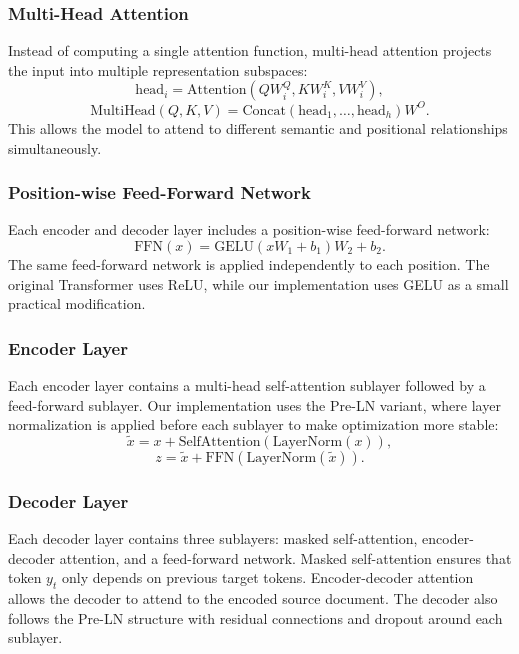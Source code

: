 \documentclass[conference]{IEEEtran}
\begin{document}
\subsubsection{Multi-Head Attention}
Instead of computing a single attention function, multi-head attention projects the input into multiple representation subspaces:
\begin{equation}
\mathrm{head}_i = \mathrm{Attention}(QW_i^Q, KW_i^K, VW_i^V),
\end{equation}
\begin{equation}
\mathrm{MultiHead}(Q,K,V) = \mathrm{Concat}(\mathrm{head}_1, \ldots, \mathrm{head}_h)W^O.
\end{equation}
This allows the model to attend to different semantic and positional relationships simultaneously.

\subsubsection{Position-wise Feed-Forward Network}
Each encoder and decoder layer includes a position-wise feed-forward network:
\begin{equation}
\mathrm{FFN}(x) = \mathrm{GELU}(xW_1 + b_1)W_2 + b_2.
\end{equation}
The same feed-forward network is applied independently to each position. The original Transformer uses ReLU, while our implementation uses GELU as a small practical modification.

\subsubsection{Encoder Layer}
Each encoder layer contains a multi-head self-attention sublayer followed by a feed-forward sublayer. Our implementation uses the Pre-LN variant, where layer normalization is applied before each sublayer to make optimization more stable:
\begin{equation}
\tilde{x} = x + \mathrm{SelfAttention}(\mathrm{LayerNorm}(x)),
\end{equation}
\begin{equation}
z = \tilde{x} + \mathrm{FFN}(\mathrm{LayerNorm}(\tilde{x})).
\end{equation}

\subsubsection{Decoder Layer}
Each decoder layer contains three sublayers: masked self-attention, encoder-decoder attention, and a feed-forward network. Masked self-attention ensures that token $y_t$ only depends on previous target tokens. Encoder-decoder attention allows the decoder to attend to the encoded source document. The decoder also follows the Pre-LN structure with residual connections and dropout around each sublayer.
\end{document}
